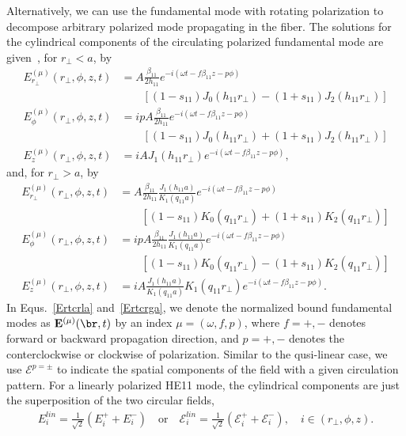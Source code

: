 \documentclass[]{report}
\begin{document}
Alternatively, we can use the fundamental mode with rotating polarization to decompose arbitrary polarized mode propagating in the fiber. The solutions for the cylindrical components of the circulating polarized fundamental mode are given~\cite{Lacroute2012,Vetsch2010a}, for $ r_\perp<a $, by
\begin{subequations}
\label{Ertcrla}
\begin{align}
E^{(\mu)}_{r_\perp}(r_\perp,\phi,z,t) &=A\frac{\beta_{11}}{2h_{11}}e^{-i(\omega t-f\beta_{11} z -p\phi)}\nonumber\\
&\qquad \left[ (1-s_{11})J_0(h_{11}r_\perp)-(1+s_{11})J_2(h_{11}r_\perp) \right]\\
E^{(\mu)}_\phi(r_\perp,\phi,z,t) &=  ipA \frac{\beta_{11}}{2h_{11}}e^{-i(\omega t-f\beta_{11} z -p\phi)} \nonumber\\
&\qquad \left[ (1-s_{11})J_0(h_{11}r_\perp) +(1+s_{11})J_2(h_{11}r_\perp) \right] \\
E^{(\mu)}_z(r_\perp,\phi,z,t) &= iA J_1(h_{11}r_\perp) e^{-i(\omega t-f\beta_{11} z -p\phi)},
\end{align}
\end{subequations}
and, for $ r_\perp>a $, by
\begin{subequations}
\label{Ertcrga}
\begin{align}
E^{(\mu)}_{r_\perp}(r_\perp,\phi,z,t) &=A\frac{\beta_{11}}{2h_{11}}\frac{J_1(h_{11}a)}{K_1(q_{11}a)}e^{-i(\omega t-f\beta_{11} z -p\phi)} \nonumber\\ 
&\qquad \left[ (1-s_{11})K_0(q_{11}r_\perp)+(1+s_{11})K_2(q_{11}r_\perp) \right]\\
E^{(\mu)}_\phi(r_\perp,\phi,z,t) &=  ipA \frac{\beta_{11}}{2h_{11}} \frac{J_1(h_{11}a)}{K_1(q_{11}a)}e^{-i(\omega t-f\beta_{11} z -p\phi)} \nonumber\\ 
&\qquad \left[ (1-s_{11})K_0(q_{11}r_\perp) - (1+s_{11})K_2(q_{11}r_\perp) \right] \\
E^{(\mu)}_z(r_\perp,\phi,z,t) &= iA \frac{J_1(h_{11}a)}{K_1(q_{11}a)} K_1(q_{11}r_\perp) e^{-i(\omega t-f\beta_{11} z -p\phi)}.
\end{align}
\end{subequations}
In Equs.~\ref{Ertcrla} and~\ref{Ertcrga}, we denote the normalized bound fundamental modes as $ \mathbf{E}^{(\mu)} (\br,t)$ by an index $ \mu=(\omega,f,p) $, where $ f=+,- $ denotes forward or backward propagation direction, and $ p=+,- $ denotes the conterclockwise or clockwise of polarization. Similar to the qusi-linear case, we use $ \boldsymbol{\mathcal{E}}^{p=\pm} $ to indicate the spatial components of the field with a given circulation pattern. For a linearly polarized HE11 mode, the cylindrical components are just the superposition of the two circular fields, 
\begin{align}\label{Eilincyc}
E_i^{lin} = \frac{1}{\sqrt{2}}(E_i^+ + E_i^-)\quad \mathrm{or}\quad \mathcal{E}_i^{lin} = \frac{1}{\sqrt{2}}(\mathcal{E}_i^+ + \mathcal{E}_i^-),\quad i\in(r_\perp,\phi,z).
\end{align}
\end{document}
